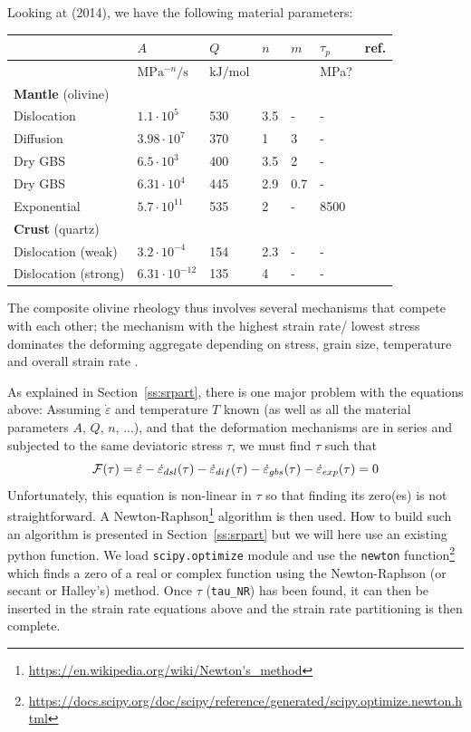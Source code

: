 Looking at \textcite{gupr14} (2014), we have the following material parameters:

\begin{center}
\begin{tabular}{lllllll}
\hline
& $A$ & $Q$ & $n$ & $m$ & $\tau_p$ & ref. \\
\hline\hline
 & $\si{\mega\pascal^{-n}\per\second}$ & $\si{\kilo\joule\per\mole}$ &&& \si{\mega\pascal}?\\
\textbf{Mantle} (olivine)  &  \\ 
Dislocation       & $1.1\cdot10^5$    &530& 3.5 & -  &-   &\cite{hiko03}\\
Diffusion         & $3.98\cdot 10^7$  &370& 1   & 3  &-   &\\
Dry GBS           & $6.5\cdot10^3$    &400& 3.5 & 2  &-   &\\
Dry GBS           & $6.31\cdot10^4$   &445& 2.9 & 0.7&-   &\cite{hazk11}\\
Exponential       & $5.7\cdot10^{11}$ &535& 2   & -  &8500&\cite{goet78}\\
\hline
\textbf{Crust} (quartz) &\\
Dislocation (weak)   &  $3.2\cdot10^{-4}$    & 154 & 2.3&- & - & \cite{kikr87}\\
Dislocation (strong) &  $6.31\cdot 10^{-12}$ & 135 & 4&- & - & \cite{hitd01}\\
\hline
\end{tabular}
\end{center}

The composite olivine rheology thus involves several mechanisms
that compete with each other; the mechanism with the highest strain rate/
lowest stress dominates the deforming aggregate depending on stress,
grain size, temperature and overall strain rate \cite{gupr14}.

As explained in Section~\ref{ss:srpart}, there is one major problem with the equations above: 
Assuming $\dot\varepsilon$ and temperature $T$ known (as well as all the material parameters $A$, $Q$, $n$, ...), 
and that the deformation mechanisms are in series and subjected to the same deviatoric stress $\tau$,
we must find $\tau$ such that 
\[
{\cal F}(\tau) = \dot\varepsilon -  \dot\varepsilon_{dsl}(\tau) 
-\dot\varepsilon_{dif}(\tau) -\dot\varepsilon_{gbs}(\tau) - \dot\varepsilon_{exp}(\tau) =0
\]
Unfortunately, this equation is non-linear in $\tau$ so that finding its zero(es) is not 
straightforward. A Newton-Raphson\footnote{\url{https://en.wikipedia.org/wiki/Newton's_method}} 
algorithm is then used. How to build such an algorithm is presented in Section~\ref{ss:srpart} 
but we will here use an existing python function. 
We load \lstinline{scipy.optimize} module and use the \lstinline{newton} function\footnote{\url{
https://docs.scipy.org/doc/scipy/reference/generated/scipy.optimize.newton.html}}
which finds a zero of a real or complex function using the Newton-Raphson (or secant or Halley’s) method.
Once $\tau$ (\lstinline{tau_NR}) has been found, it can then be inserted in the strain rate equations above and
the strain rate partitioning is then complete.

